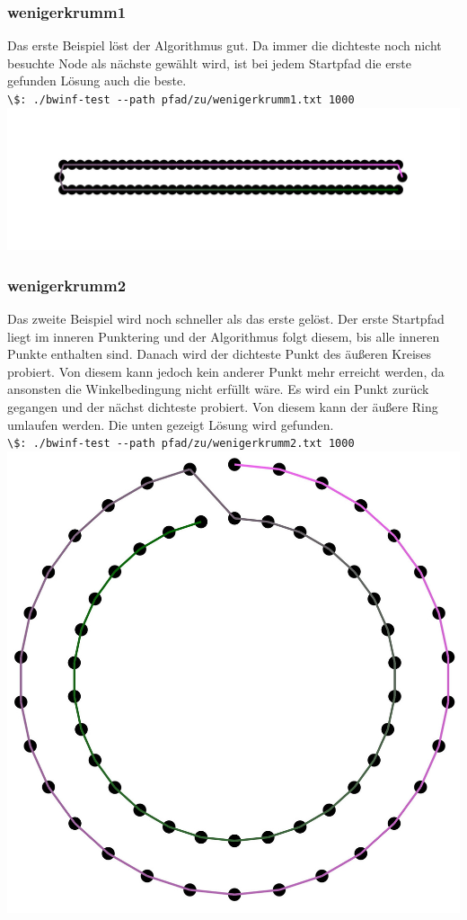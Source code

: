 \documentclass[a4paper,10pt,ngerman]{scrartcl}
\begin{document}
    \subsubsection{wenigerkrumm1}
        Das erste Beispiel löst der Algorithmus gut. Da immer die dichteste noch nicht besuchte Node als nächste gewählt wird, ist bei jedem Startpfad die erste gefunden Lösung auch die beste.\\
        \lstinline{\$: ./bwinf-test --path pfad/zu/wenigerkrumm1.txt 1000} \\ 
        \includegraphics[]{output__wenigerkrumm1__847.4342.jpg} 
    \subsubsection{wenigerkrumm2}
        Das zweite Beispiel wird noch schneller als das erste gelöst. Der erste Startpfad liegt im inneren Punktering und der Algorithmus folgt diesem, bis alle inneren Punkte enthalten sind. Danach wird der dichteste Punkt des äußeren Kreises probiert. Von diesem kann jedoch kein anderer Punkt mehr erreicht werden, da ansonsten die Winkelbedingung nicht erfüllt wäre. Es wird ein Punkt zurück gegangen und der nächst dichteste probiert. Von diesem kann der äußere Ring umlaufen werden. Die unten gezeigt Lösung wird gefunden. \\
        \lstinline{\$: ./bwinf-test --path pfad/zu/wenigerkrumm2.txt 1000} \\
        \includegraphics[]{output__wenigerkrumm2__2183.662.jpg} \newpage
\end{document}
